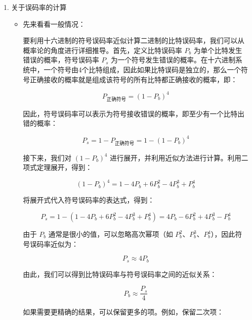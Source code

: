 \begin{enumerate}
	公共信道处的光子到达 $\mathrm{OC_M}$ 后，此时又经过了4个衰减，那么最后的功率为：
	\begin{align*}
		P = -96.66 \mathrm{dBm} = 10^{\frac{-96.66}{10}} \mathrm{mW} = 2.16 \times 10^{-10} \mathrm{mW} = 2.16 \times 10^{-13} \mathrm{W}
	\end{align*}	
		
	到达 $\mathrm{OC_M}$ 的每脉冲平均光子数为：
	$$ \mu = \frac{P}{f \cdot E} = \frac{2.16 \times 10^{-13}}{10 \times 10^{6} \times 4.92 \times 10^{-19}} = 0.044 $$
		
	最后得单光子探测器的探测计数 N 为：
	$$ N = f \cdot \mu \cdot \eta = 10 \times 10^{6} \times 0.044 \times 35.3 \% = 155320 $$
	
	\item 关于误码率的计算
	\begin{itemize}
		\item 先来看看一般情况：
		
		要利用十六进制的符号误码率近似计算二进制的比特误码率，我们可以从概率论的角度进行详细推导。首先，定义比特误码率 \( P_b \) 为单个比特发生错误的概率，符号误码率 \( P_s \) 为一个符号发生错误的概率。在十六进制系统中，一个符号由4个比特组成，因此如果比特误码是独立的，那么一个符号正确接收的概率就是组成该符号的所有比特都正确接收的概率，即：
		
		\[
		P_{\text{正确符号}} = (1 - P_b)^4
		\]
		
		因此，符号误码率可以表示为符号接收错误的概率，即至少有一个比特出错的概率：
		
		\[
		P_s = 1 - P_{\text{正确符号}} = 1 - (1 - P_b)^4
		\]
		
		接下来，我们对 \( (1 - P_b)^4 \) 进行展开，并利用近似方法进行计算。利用二项式定理展开，得到：
		
		\[
		(1 - P_b)^4 = 1 - 4P_b + 6P_b^2 - 4P_b^3 + P_b^4
		\]
		
		将展开式代入符号误码率的表达式，得到：
		
		\[
		P_s = 1 - \left(1 - 4P_b + 6P_b^2 - 4P_b^3 + P_b^4\right) = 4P_b - 6P_b^2 + 4P_b^3 - P_b^4
		\]
		
		由于 \( P_b \) 通常是很小的值，可以忽略高次幂项（如 \( P_b^2 \)、\( P_b^3 \)、\( P_b^4 \)），因此符号误码率近似为：
		
		\[
		P_s \approx 4P_b
		\]
		
		由此，我们可以得到比特误码率与符号误码率之间的近似关系：
		
		\[
		P_b \approx \frac{P_s}{4}
		\]
		
		如果需要更精确的结果，可以保留更多的项。例如，保留二次项：
		

\end{itemize}
\end{enumerate}
